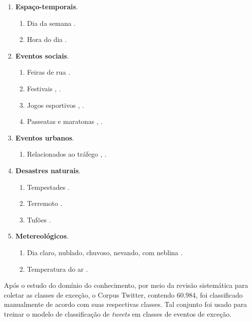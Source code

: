 \documentclass[
	12pt,				%
	oneside,			%
	a4paper,			%
	english,			%
	brazil				%
	]{abntex2ppgsi}
\begin{document}
{{{\begin{enumerate}
\item \textbf{Espaço-temporais}.
\begin{enumerate}
\item Dia da semana \cite{Chen2016}.
\item Hora do dia \cite{Chen2016}.
\end{enumerate}

\item \textbf{Eventos sociais}.
\begin{enumerate}
\item Feiras de rua \cite{Chen2016}.
\item Festivais \cite{Chen2016}, \cite{Lecue2014}.
\item Jogos esportivos \cite{Chen2016}, \cite{Gal-Tzur2014}.
\item Passeatas e maratonas \cite{Chen2016}, \cite{Itoh2016}.
\end{enumerate}

\item \textbf{Eventos urbanos}.
\begin{enumerate}
\item Relacionados ao tráfego \cite{Chen2016}, \cite{Lecue2014}.
\end{enumerate}

\item \textbf{Desastres naturais}.
\begin{enumerate}
\item Tempestades \cite{Itoh2016}.
\item Terremoto \cite{Itoh2016}.
\item Tufões \cite{Itoh2016}.
\end{enumerate}

\item \textbf{Metereológicos}.
\begin{enumerate}
\item Dia claro, nublado, chuvoso, nevando, com neblina \cite{Chen2016}.
\item Temperatura do ar \cite{Chen2016}.
\end{enumerate}
\end{enumerate}

Após o estudo do domínio do conhecimento, por meio da revisão sistemática para coletar as classes de exceção, o Corpus Twitter, contendo 60.984, foi classificado manualmente de acordo com suas respectivas classes. Tal conjunto foi usado para treinar o modelo de classificação de \textit{tweets} em classes de eventos de exceção. 

}}}
\end{document}
